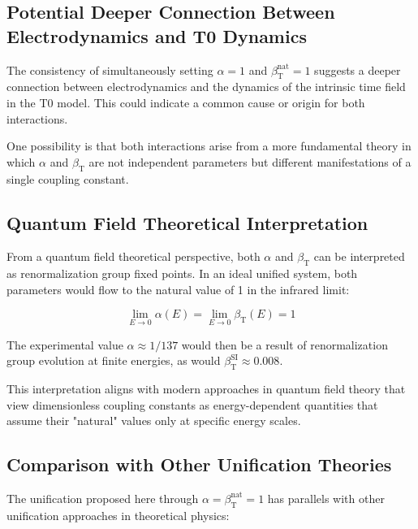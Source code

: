 \documentclass[12pt,a4paper]{article}
\newcommand{\betaT}{\beta_{\text{T}}}
\begin{document}
	\subsection{Potential Deeper Connection Between Electrodynamics and T0 Dynamics}
	
	The consistency of simultaneously setting \(\alpha = 1\) and \(\betaT^{\text{nat}} = 1\) suggests a deeper connection between electrodynamics and the dynamics of the intrinsic time field in the T0 model. This could indicate a common cause or origin for both interactions.
	
	One possibility is that both interactions arise from a more fundamental theory in which \(\alpha\) and \(\betaT\) are not independent parameters but different manifestations of a single coupling constant.
	
	\subsection{Quantum Field Theoretical Interpretation}
	
	From a quantum field theoretical perspective, both \(\alpha\) and \(\betaT\) can be interpreted as renormalization group fixed points. In an ideal unified system, both parameters would flow to the natural value of 1 in the infrared limit:
	
	\begin{equation}
		\lim_{E \to 0} \alpha(E) = \lim_{E \to 0} \betaT(E) = 1
	\end{equation}
	
	The experimental value \(\alpha \approx 1/137\) would then be a result of renormalization group evolution at finite energies, as would \(\betaT^{\text{SI}} \approx 0.008\).
	
	This interpretation aligns with modern approaches in quantum field theory that view dimensionless coupling constants as energy-dependent quantities that assume their "natural" values only at specific energy scales.
	
	\subsection{Comparison with Other Unification Theories}
	
	The unification proposed here through \(\alpha = \betaT^{\text{nat}} = 1\) has parallels with other unification approaches in theoretical physics:
	
\end{document}
